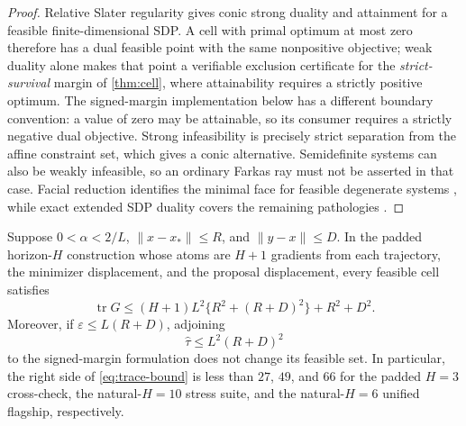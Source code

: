 \documentclass[smallextended]{svjour3}
\newcommand{\norm}[1]{\lVert #1\rVert}
\newcommand{\eps}{\varepsilon}
\begin{document}
\begin{proof}
Relative Slater regularity gives conic strong duality and attainment for a
feasible finite-dimensional SDP.  A cell with primal optimum at most zero
therefore has a dual feasible point with the same nonpositive objective; weak
duality alone makes that point a verifiable exclusion certificate for the
\emph{strict-survival} margin of \cref{thm:cell}, where attainability requires
a strictly positive optimum.  The signed-margin implementation below has a
different boundary convention: a value of zero may be attainable, so its
consumer requires a strictly negative dual objective.  Strong
infeasibility is precisely strict separation from the affine constraint set,
which gives a conic alternative.  Semidefinite systems can also be weakly
infeasible, so an ordinary Farkas ray must not be asserted in that case.
Facial reduction identifies the minimal face for feasible degenerate systems
\citep{BorweinWolkowicz1981}, while exact extended SDP duality covers the
remaining pathologies \citep{Ramana1997}.
\end{proof}

\begin{lemma}
\label{lem:trace-bound}
Suppose $0<\alpha<2/L$, $\norm{x-x_*}\leq R$, and
$\norm{y-x}\leq D$.  In the padded horizon-$H$ construction whose atoms are
$H+1$ gradients from each trajectory, the minimizer displacement, and the
proposal displacement, every feasible cell satisfies
\begin{equation}
 \operatorname{tr}G
 \leq (H+1)L^2\{R^2+(R+D)^2\}+R^2+D^2.             \label{eq:trace-bound}
\end{equation}
Moreover, if $\eps\leq L(R+D)$, adjoining
\begin{equation}
 \widehat\tau\leq L^2(R+D)^2                       \label{eq:margin-upper}
\end{equation}
to the signed-margin formulation does not change its feasible set.  In
particular, the right side of \eqref{eq:trace-bound} is less than $27$, $49$,
and $66$ for the padded $H=3$ cross-check, the natural-$H=10$ stress suite,
and the natural-$H=6$ unified flagship, respectively.
\end{lemma}
\end{document}
